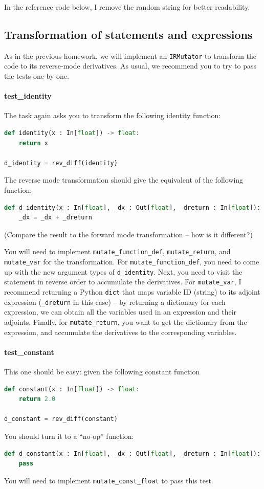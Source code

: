 In the reference code below, I remove the random string for better readability.

\subsection{Transformation of statements and expressions}
As in the previous homework, we will implement an \lstinline{IRMutator} to transform the code to its reverse-mode derivatives. As usual, we recommend you to try to pass the tests one-by-one. 

\paragraph{test_identity} The task again asks you to transform the following identity function:
\begin{lstlisting}[language=Python]
def identity(x : In[float]) -> float:
    return x

d_identity = rev_diff(identity)
\end{lstlisting}
The reverse mode transformation should give the equivalent of the following function:
\begin{lstlisting}[language=Python]
def d_identity(x : In[float], _dx : Out[float], _dreturn : In[float]):
	_dx = _dx + _dreturn
\end{lstlisting}
(Compare the result to the forward mode transformation -- how is it different?)

You will need to implement \lstinline{mutate_function_def}, \lstinline{mutate_return}, and \lstinline{mutate_var} for the transformation. For \lstinline{mutate_function_def}, you need to come up with the new argument types of \lstinline{d_identity}. Next, you need to visit the statement in reverse order to accumulate the derivatives. For \lstinline{mutate_var}, I recommend returning a Python \lstinline{dict} that maps variable ID (string) to its adjoint expression (\lstinline{_dreturn} in this case) -- by returning a dictionary for each expression, we can obtain all the variables used in an expression and their adjoints. Finally, for \lstinline{mutate_return}, you want to get the dictionary from the expression, and accumulate the derivatives to the corresponding variables. 

\paragraph{test_constant} This one should be easy: given the following constant function
\begin{lstlisting}[language=Python]
def constant(x : In[float]) -> float:
    return 2.0

d_constant = rev_diff(constant)
\end{lstlisting}
You should turn it to a ``no-op'' function:
\begin{lstlisting}[language=Python]
def d_constant(x : In[float], _dx : Out[float], _dreturn : In[float]):
	pass
\end{lstlisting}
You will need to implement \lstinline{mutate_const_float} to pass this test.

